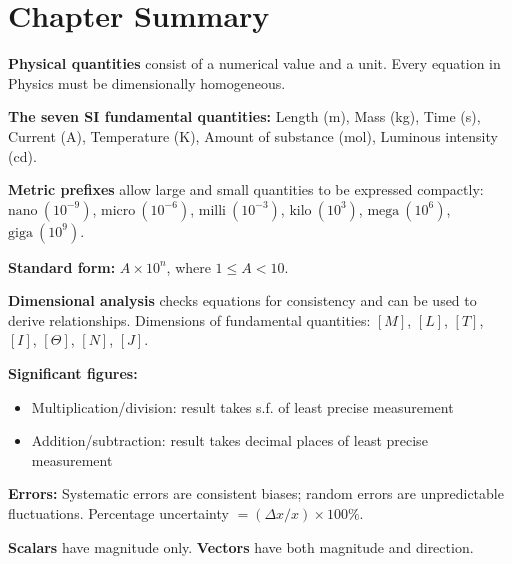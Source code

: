 \vspace{3.4cm}

\section{Chapter Summary}

\begin{summarybox}

\textbf{Physical quantities} consist of a numerical value
and a unit. Every equation in Physics must be dimensionally
homogeneous.

\vspace{0.4cm}

\textbf{The seven SI fundamental quantities:}
Length (m), Mass (kg), Time (s), Current (A),
Temperature (K), Amount of substance (mol),
Luminous intensity (cd).

\vspace{0.4cm}

\textbf{Metric prefixes} allow large and small quantities
to be expressed compactly:
$\text{nano}\ (10^{-9})$,
$\text{micro}\ (10^{-6})$,
$\text{milli}\ (10^{-3})$,
$\text{kilo}\ (10^3)$,
$\text{mega}\ (10^6)$,
$\text{giga}\ (10^9)$.

\vspace{0.4cm}

\textbf{Standard form:} $A \times 10^n$, where
$1 \leq A < 10$.

\vspace{0.4cm}

\textbf{Dimensional analysis} checks equations for
consistency and can be used to derive relationships.
Dimensions of fundamental quantities: $[M]$, $[L]$, $[T]$,
$[I]$, $[\Theta]$, $[N]$, $[J]$.

\vspace{0.4cm}

\textbf{Significant figures:}
\begin{itemize}[noitemsep]
  \item Multiplication/division: result takes s.f. of
  least precise measurement
  \item Addition/subtraction: result takes decimal places
  of least precise measurement
\end{itemize}

\vspace{0.4cm}

\textbf{Errors:}
Systematic errors are consistent biases;
random errors are unpredictable fluctuations.
Percentage uncertainty $= (\Delta x / x) \times 100\%$.

\vspace{0.4cm}

\textbf{Scalars} have magnitude only.
\textbf{Vectors} have both magnitude and direction.

\end{summarybox}

